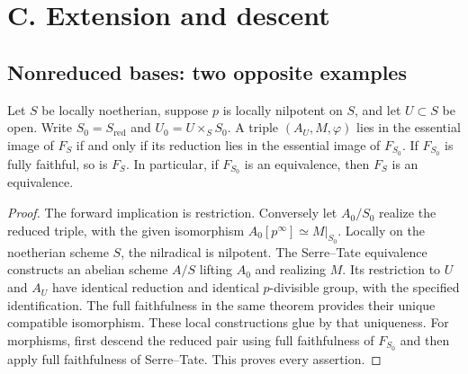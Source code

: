\section{C. Extension and descent}
\subsection{Nonreduced bases: two opposite examples}

\begin{proposition}\label{prop:C-RD3}
Let $S$ be locally noetherian, suppose $p$ is locally nilpotent on $S$, and
let $U\subset S$ be open. Write $S_0=S_{\mathrm{red}}$ and
$U_0=U\times_SS_0$. A triple $(A_U,M,\varphi)$ lies in the essential image
of $F_S$ if and only if its reduction lies in the essential image of
$F_{S_0}$. If $F_{S_0}$ is fully faithful, so is $F_S$. In particular,
if $F_{S_0}$ is an equivalence, then $F_S$ is an equivalence.
\end{proposition}
\begin{proof}
The forward implication is restriction. Conversely let $A_0/S_0$
realize the reduced triple, with the given isomorphism
$A_0[p^\infty]\simeq M|_{S_0}$. Locally on the noetherian scheme $S$,
the nilradical is nilpotent. The Serre--Tate equivalence
\cite[Theorem~1.2.1]{Katz1981SerreTate} constructs an abelian scheme
$A/S$ lifting $A_0$ and realizing $M$. Its restriction to $U$ and $A_U$
have identical reduction and identical $p$-divisible group, with the
specified identification. The full faithfulness in the same theorem
provides their unique compatible isomorphism. These local constructions
glue by that uniqueness. For morphisms, first descend the reduced pair
using full faithfulness of $F_{S_0}$ and then apply full faithfulness of
Serre--Tate. This proves every assertion.
\end{proof}

